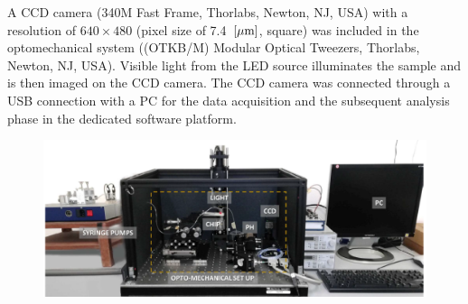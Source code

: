 \documentclass[journal]{IEEEtran}
\theoremstyle{definition}
\theoremstyle{remark}
\begin{document}
A CCD camera (340M Fast Frame, Thorlabs, Newton, NJ, USA) with a resolution of $640 \times 480$ \pixel (pixel size of 7.4~$[\rm\mu m]$, square) was included in the optomechanical system ((OTKB/M) Modular Optical Tweezers, Thorlabs, Newton, NJ, USA). Visible light from the LED source illuminates the sample and is then imaged on the CCD camera.
The CCD camera was connected through a USB connection with a PC for the data acquisition and the subsequent analysis phase in the dedicated software platform.


\begin{figure}[t]
	\centering
	\includegraphics[width=2\columnwidth]{images/setup}
\end{figure}
\end{document}
